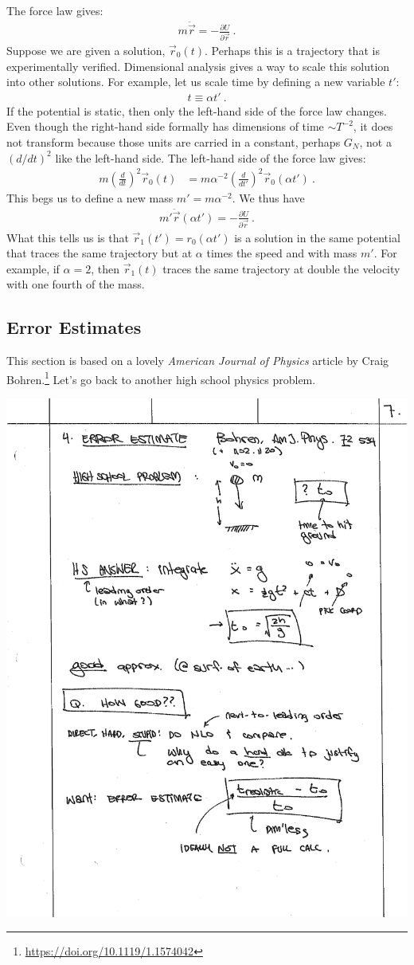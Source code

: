 The force law gives:
\begin{align}
  m 
  \ddot{\vec{r}} = - \frac{\partial U}{\partial\vec{r}} \ .
\end{align}
Suppose we are given a solution, $\vec r_0(t)$. Perhaps this is a trajectory that is experimentally verified. Dimensional analysis gives a way to scale this solution into other solutions. For example, let us scale time by defining a new variable $t'$:
\begin{align}
  t \equiv \alpha t' \ .
\end{align}
If the potential is static, then only the left-hand side of the force law changes. Even though the right-hand side formally has dimensions of time $\sim T^{-2}$, it does not transform because those units are carried in a constant, perhaps $G_N$, not a $(d/dt)^2$ like the left-hand side. The left-hand side of the force law gives:
\begin{align}
  m\left(\frac{d}{dt}\right)^2 \vec r_0(t) 
  &=
  m\alpha^{-2} \left(\frac{d}{dt'}\right)^2 \vec r_0(\alpha t') \ .
\end{align}
This begs us to define a new mass $m' = m\alpha^{-2}$. We thus have
\begin{align}
   m'\ddot{\vec{r}}(\alpha t')
  = - \frac{\partial U}{\partial\vec{r}} \ .
\end{align}
What this tells us is that $\vec r_1(t') = r_0(\alpha t')$ is a solution in the same potential that traces the same trajectory but at $\alpha$ times the speed and with mass $m'$. For example, if $\alpha = 2$, then $\vec r_1(t)$ traces the same trajectory at double the velocity with one fourth of the mass. 

\subsection{Error Estimates}

This section is based on a lovely \emph{American Journal of Physics} article by Craig Bohren.\footnote{\url{https://doi.org/10.1119/1.1574042}} Let’s go back to another high school physics problem. 

\begin{center}
\includegraphics[width=.4\textwidth]{figures/lec01_drop.pdf}
\end{center}

